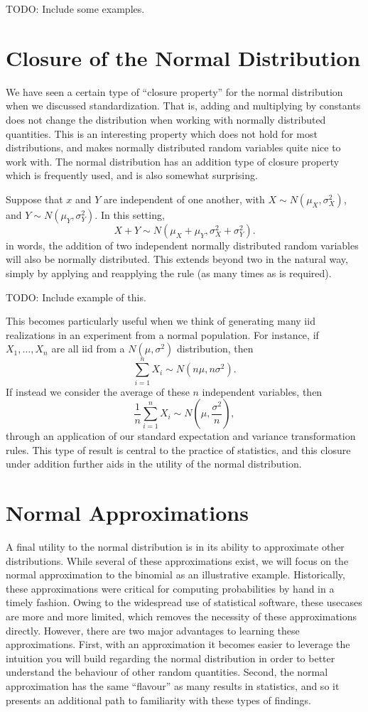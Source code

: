 \documentclass[
  letterpaper,
  DIV=11,
  numbers=noendperiod]{scrreprt}
\begin{document}
TODO: Include some examples.

\section{Closure of the Normal
Distribution}\label{closure-of-the-normal-distribution}

We have seen a certain type of ``closure property'' for the normal
distribution when we discussed standardization. That is, adding and
multiplying by constants does not change the distribution when working
with normally distributed quantities. This is an interesting property
which does not hold for most distributions, and makes normally
distributed random variables quite nice to work with. The normal
distribution has an addition type of closure property which is
frequently used, and is also somewhat surprising.

Suppose that \(x\) and \(Y\) are independent of one another, with
\(X\sim N(\mu_X, \sigma_X^2)\), and \(Y\sim N(\mu_Y, \sigma_Y^2)\). In
this setting, \[X+Y\sim N(\mu_X+\mu_Y, \sigma_X^2 + \sigma_Y^2).\] in
words, the addition of two independent normally distributed random
variables will also be normally distributed. This extends beyond two in
the natural way, simply by applying and reapplying the rule (as many
times as is required).

TODO: Include example of this.

This becomes particularly useful when we think of generating many iid
realizations in an experiment from a normal population. For instance, if
\(X_1,\dots,X_n\) are all iid from a \(N(\mu,\sigma^2)\) distribution,
then \[\sum_{i=1}^n X_i \sim N(n\mu, n\sigma^2).\] If instead we
consider the average of these \(n\) independent variables, then
\[\frac{1}{n}\sum_{i=1}^n X_i \sim N(\mu, \frac{\sigma^2}{n}),\] through
an application of our standard expectation and variance transformation
rules. This type of result is central to the practice of statistics, and
this closure under addition further aids in the utility of the normal
distribution.

\section{Normal Approximations}\label{normal-approximations}

A final utility to the normal distribution is in its ability to
approximate other distributions. While several of these approximations
exist, we will focus on the normal approximation to the binomial as an
illustrative example. Historically, these approximations were critical
for computing probabilities by hand in a timely fashion. Owing to the
widespread use of statistical software, these usecases are more and more
limited, which removes the necessity of these approximations directly.
However, there are two major advantages to learning these
approximations. First, with an approximation it becomes easier to
leverage the intuition you will build regarding the normal distribution
in order to better understand the behaviour of other random quantities.
Second, the normal approximation has the same ``flavour'' as many
results in statistics, and so it presents an additional path to
familiarity with these types of findings.
\end{document}
